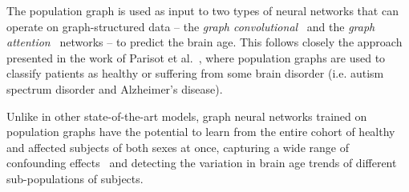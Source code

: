 The population graph is used as input to two types of neural networks that can operate on graph-structured data – the \textit{graph convolutional}~\cite{kipf2017semi} and the \textit{graph attention}~\cite{velickovic2018graph} networks – to predict the brain age. This follows closely the approach presented in the work of Parisot et al.~\cite{parisot2017spectral,parisot2018disease}, where population graphs are used to classify patients as healthy or suffering from some brain disorder (i.e. autism spectrum disorder and Alzheimer's disease).


Unlike in other state-of-the-art models, graph neural networks trained on population graphs have the potential to learn from the entire cohort of healthy and affected subjects of both sexes at once, capturing a wide range of confounding effects~\cite{ruigrok2014meta, lancet2016sex} and detecting the variation in brain age trends of different sub-populations of subjects. 




